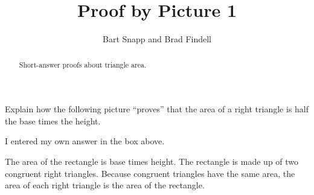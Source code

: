 \documentclass[nooutcomes,space,handout]{ximera}
\title{Proof by Picture 1}
\author{Bart Snapp and Brad Findell}
\begin{document}
\begin{abstract}
Short-answer proofs about triangle area. 
\end{abstract}
\maketitle


\begin{problem}
Explain how the following picture ``proves'' that
  the area of a right triangle is half the base times the height.
\begin{image}
\end{image}

\begin{freeResponse}
\end{freeResponse}

I  entered my own answer in the box above.  

\begin{problem}
The area of the rectangle is base times height.  The rectangle is made up of two congruent right triangles.  Because congruent triangles have the same area, the area of each right triangle is  the area of the rectangle.  
\end{problem}

\end{problem}
\end{document}
